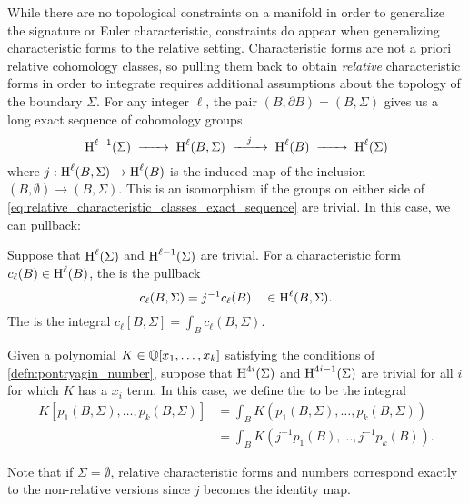 While there are no topological constraints on a manifold in order to generalize the signature or Euler characteristic, constraints do appear when generalizing characteristic forms to the relative setting.
Characteristic forms are not a priori relative cohomology classes, so pulling them back to obtain \emph{relative} characteristic forms in order to integrate requires additional assumptions about the topology of the boundary $\Sigma$.
For any integer $\ell$, the pair $(B, \partial B) = (B, \Sigma)$ gives us a long exact sequence of cohomology groups
\begin{equation}\label{eq:relative_characteristic_classes_exact_sequence}
	\H^{\ell-1}(\Sigma) \lkxto \H^{\ell}(B, \Sigma) \lkxto[j] \H^{\ell}(B) \lkxto \H^{\ell}(\Sigma)
\end{equation}
where $j : \operatorname{H}^{\ell}(B, \Sigma) \to \operatorname{H}^{\ell}(B)$ is the induced map of the inclusion $(B,\emptyset) \to (B, \Sigma)$. This is an isomorphism if the groups on either side of \cref{eq:relative_characteristic_classes_exact_sequence} are trivial. In this case, we can pullback:

\begin{definition}\label{defn:relative_characteristic_form}
	Suppose that $\operatorname{H}^{\ell}(\Sigma)$ and $\operatorname{H}^{\ell-1}(\Sigma)$ are trivial. For a characteristic form $c_\ell(B) \in \operatorname{H}^{\ell}(B)$, the  is the pullback
	\[
		c_\ell(B, \Sigma) = j^{-1} c_\ell(B) \quad\in \operatorname{H}^{\ell}(B, \Sigma).
	\]
	The  is the integral $c_\ell[B,\Sigma]=\int_B c_\ell(B,\Sigma)$.
\end{definition}

\begin{definition}\label{defn:relative_characteristic_number}
	Given a polynomial $K\in \mathbb{Q}[x_1,\ldots, x_k]$ satisfying the conditions of \cref{defn:pontryagin_number}, suppose that $\operatorname{H}^{4i}(\Sigma)$ and $\operatorname{H}^{4i-1}(\Sigma)$ are trivial for all $i$ for which $K$ has a $x_i$ term.
	In this case, we define the  to be the integral
	\[
		\begin{aligned}
			K[p_1(B, \Sigma), \ldots, p_k(B,\Sigma)]
			 & = \int_B K(p_1(B, \Sigma), \ldots, p_k(B, \Sigma)) \\
			 & = \int_B K(j^{-1}p_1(B), \ldots, j^{-1}p_k(B)).
		\end{aligned}
	\]
\end{definition}

\begin{remark}
	Note that if $\Sigma=\emptyset$, relative characteristic forms and numbers correspond exactly to the non-relative versions since $j$ becomes the identity map.
\end{remark}

